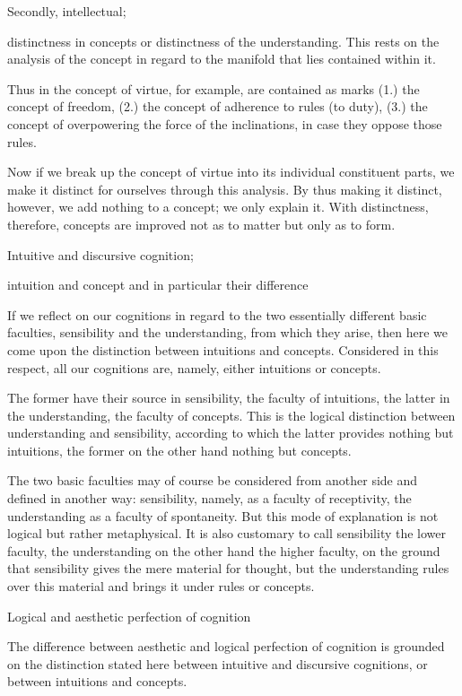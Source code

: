 Secondly, intellectual;

distinctness in concepts or distinctness of the understanding.
This rests on the analysis of the concept in regard to
the manifold that lies contained within it.

Thus in the concept of virtue, for example, are contained as marks
(1.) the concept of freedom,
(2.) the concept of adherence to rules (to duty),
(3.) the concept of overpowering the force of the inclinations,
in case they oppose those rules.

    Now if we break up the concept of virtue into its individual constituent parts,
    we make it distinct for ourselves through this analysis.
    By thus making it distinct, however, we add nothing to a concept; we only explain it.
    With distinctness, therefore, concepts are improved not as to matter but only as to form.

Intuitive and discursive cognition;

intuition and concept and in particular their difference

If we reflect on our cognitions in regard to the two essentially different
basic faculties, sensibility and the understanding, from which they arise,
then here we come upon the distinction between intuitions and concepts.
Considered in this respect, all our cognitions are, namely,
either intuitions or concepts.

    The former have their source in sensibility, the faculty of intuitions,
    the latter in the understanding, the faculty of concepts.
    This is the logical distinction between understanding and sensibility,
    according to which the latter provides nothing but intuitions,
    the former on the other hand nothing but concepts.

    The two basic faculties may of course be considered
    from another side and defined in another way:
    sensibility, namely, as a faculty of receptivity,
    the understanding as a faculty of spontaneity.
    But this mode of explanation is not logical but rather metaphysical.
    It is also customary to call sensibility the lower faculty,
    the understanding on the other hand the higher faculty,
    on the ground that sensibility gives the mere material for thought,
    but the understanding rules over this material
    and brings it under rules or concepts.

Logical and aesthetic perfection of cognition

The difference between aesthetic and logical perfection of cognition is
grounded on the distinction stated here
between intuitive and discursive cognitions, or
between intuitions and concepts.

